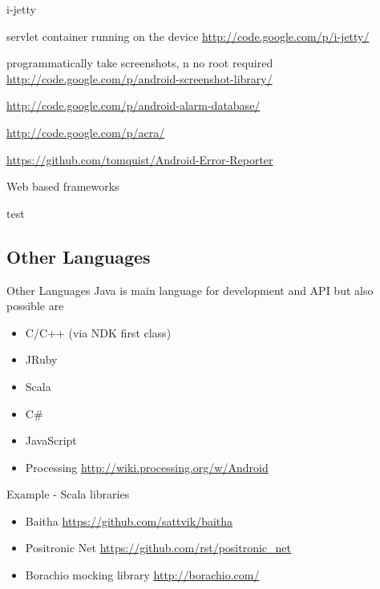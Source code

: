 \documentclass[aspectratio=169]{beamer}
\newcommand{\surl}[1] {{\tiny \url{#1}}}
\begin{document}
    \begin{frame}{i-jetty}
      \begin{description}
       \item<1->[i-jetty] servlet container running on the device \surl{http://code.google.com/p/i-jetty/}
        \item<2->[Android Screenshot library] programmatically take screenshots, n no root required \surl{http://code.google.com/p/android-screenshot-library/}
        \item<3->[Android Alarm Database] \surl{http://code.google.com/p/android-alarm-database/}
        \item<4->[Application Crash Report for Android ACRA] \surl{http://code.google.com/p/acra/}
        \item<5->[Android Error Reporter] \surl{https://github.com/tomquist/Android-Error-Reporter}
      \end{description}
    \end{frame}

    \begin{frame}{Web based frameworks}
      \begin{description}
       \item<1->[PhoneGap] test
      \end{description}
    \end{frame}

  \subsection{Other Languages}
    \begin{frame}{Other Languages}
      Java is main language for development and API but also possible are 
      \begin{itemize}
      \item C/C++ (via NDK first class)
      \item JRuby
      \item Scala
      \item C\#
      \item JavaScript 
      \item Processing \surl{http://wiki.processing.org/w/Android}
      \end{itemize}
    \end{frame}

    \begin{frame}{Example - Scala libraries}
      \begin{itemize}
       \item Baitha \surl{https://github.com/sattvik/baitha}
       \item Positronic Net \surl{https://github.com/rst/positronic_net}
       \item Borachio mocking library \surl{http://borachio.com/}
      \end{itemize}
    \end{frame}
\end{document}
